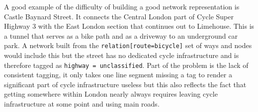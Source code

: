 A good example of the difficulty of building a good network representation is Castle Baynard Street. It connects the Central London part of Cycle Super Highway 3 with the East London section that continues out to Limehouse. This is a tunnel that serves as a bike path and as a driveway to an underground car park. A network built from the \texttt{relation[route=bicycle]} set of ways and nodes would include this but the street has no dedicated cycle infrastructure and is therefore tagged as \texttt{highway = unclassified}. Part of the problem is the lack of consistent tagging, it only takes one line segment missing a tag to render a significant part of cycle infrastructure useless but this also reflects the fact that getting somewhere within London nearly always requires leaving cycle infrastructure at some point and using main roads.

